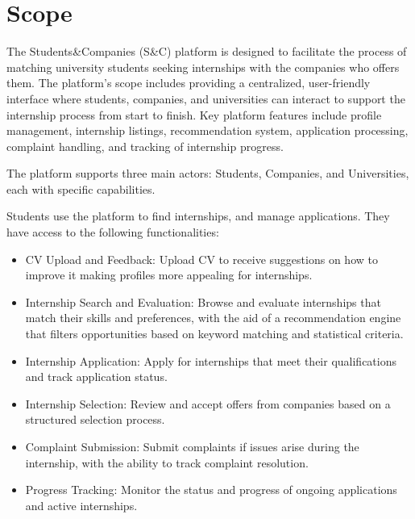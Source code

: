 \section{Scope}

The Students\&Companies (S\&C) platform is designed to facilitate the process of matching university students seeking internships with the companies who offers them. The platform's scope includes providing a centralized, user-friendly interface where students, companies, and universities can interact to support the internship process from start to finish. Key platform features include profile management, internship listings, recommendation system, application processing, complaint handling, and tracking of internship progress.

The platform supports three main actors: Students, Companies, and Universities, each with specific capabilities.

Students use the platform to find internships, and manage applications. They have access to the following functionalities: 
\begin{itemize} 
\item CV Upload and Feedback: Upload CV to receive suggestions on how to improve it making profiles more appealing for internships. 
\item Internship Search and Evaluation: Browse and evaluate internships that match their skills and preferences, with the aid of a recommendation engine that filters opportunities based on keyword matching and statistical criteria. 
\item Internship Application: Apply for internships that meet their qualifications and track application status. 
\item Internship Selection: Review and accept offers from companies based on a structured selection process. 
\item Complaint Submission: Submit complaints if issues arise during the internship, with the ability to track complaint resolution. 
\item Progress Tracking: Monitor the status and progress of ongoing applications and active internships. 
\end{itemize}

